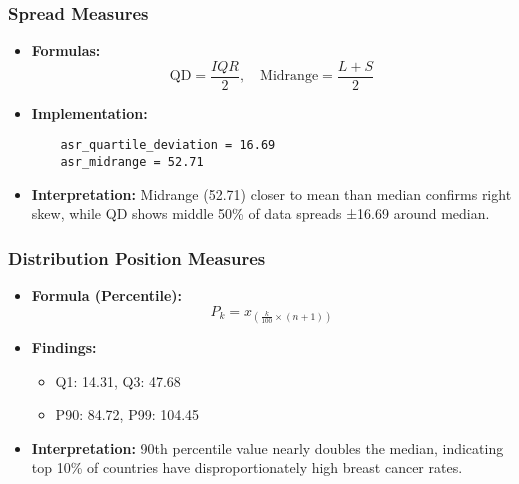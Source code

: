 \begin{frame}[fragile]
    \frametitle{Spread Measures}
    \begin{itemize}
        \item \textbf{Formulas:}
              \[
                  \text{QD} = \frac{IQR}{2},\quad \text{Midrange} = \frac{L + S}{2}
              \]

        \item \textbf{Implementation:}
              \begin{lstlisting}
    asr_quartile_deviation = 16.69
    asr_midrange = 52.71
            \end{lstlisting}

        \item \textbf{Interpretation:} Midrange (\SI{52.71}{\perthousand}) closer to mean than median confirms right skew, while QD shows middle 50\% of data spreads ±16.69 around median.
    \end{itemize}
\end{frame}

\begin{frame}[fragile]
    \frametitle{Distribution Position Measures}
    \begin{itemize}
        \item \textbf{Formula (Percentile):}
              \[
                  P_k = x_{(\frac{k}{100} \times (n + 1))}
              \]

        \item \textbf{Findings:}
              \begin{itemize}
    \item Q1: \SI{14.31}{\perthousand}, Q3: \SI{47.68}{\perthousand}
    \item P90: \SI{84.72}{\perthousand}, P99: \SI{104.45}{\perthousand}
              \end{itemize}

        \item \textbf{Interpretation:} 90th percentile value nearly doubles the median, indicating top 10\% of countries have disproportionately high breast cancer rates.
    \end{itemize}
\end{frame}